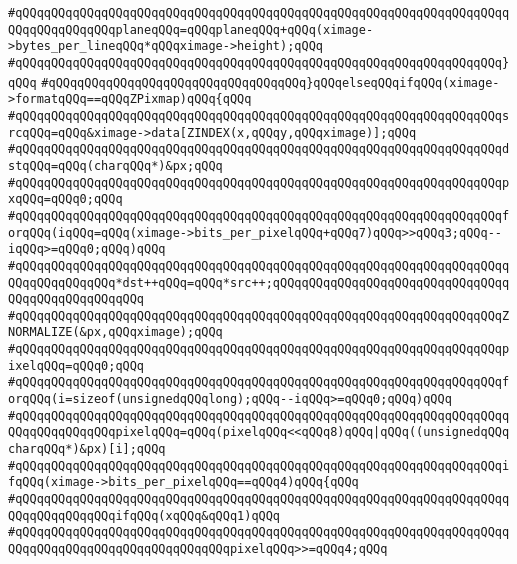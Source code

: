 \verb|#qQQqqQQqqQQqqQQqqQQqqQQqqQQqqQQqqQQqqQQqqQQqqQQqqQQqqQQqqQQqqQQqqQQqqQQqqQQqqQQqqQQqplaneqQQq=qQQqplaneqQQq+qQQq(ximage->bytes_per_lineqQQq*qQQqximage->height);qQQq|\newline
\verb|#qQQqqQQqqQQqqQQqqQQqqQQqqQQqqQQqqQQqqQQqqQQqqQQqqQQqqQQqqQQqqQQqqQQq}qQQq|\newline
\verb|#qQQqqQQqqQQqqQQqqQQqqQQqqQQqqQQqqQQq}qQQqelseqQQqifqQQq(ximage->formatqQQq==qQQqZPixmap)qQQq{qQQq|\newline
\verb|#qQQqqQQqqQQqqQQqqQQqqQQqqQQqqQQqqQQqqQQqqQQqqQQqqQQqqQQqqQQqqQQqqQQqsrcqQQq=qQQq&ximage->data[ZINDEX(x,qQQqy,qQQqximage)];qQQq|\newline
\verb|#qQQqqQQqqQQqqQQqqQQqqQQqqQQqqQQqqQQqqQQqqQQqqQQqqQQqqQQqqQQqqQQqqQQqdstqQQq=qQQq(charqQQq*)&px;qQQq|\newline
\verb|#qQQqqQQqqQQqqQQqqQQqqQQqqQQqqQQqqQQqqQQqqQQqqQQqqQQqqQQqqQQqqQQqqQQqpxqQQq=qQQq0;qQQq|\newline
\verb|#qQQqqQQqqQQqqQQqqQQqqQQqqQQqqQQqqQQqqQQqqQQqqQQqqQQqqQQqqQQqqQQqqQQqforqQQq(iqQQq=qQQq(ximage->bits_per_pixelqQQq+qQQq7)qQQq>>qQQq3;qQQq--iqQQq>=qQQq0;qQQq)qQQq|\newline
\verb|#qQQqqQQqqQQqqQQqqQQqqQQqqQQqqQQqqQQqqQQqqQQqqQQqqQQqqQQqqQQqqQQqqQQqqQQqqQQqqQQqqQQq*dst++qQQq=qQQq*src++;qQQqqQQqqQQqqQQqqQQqqQQqqQQqqQQqqQQqqQQqqQQqqQQqqQQq|\newline
\verb|#qQQqqQQqqQQqqQQqqQQqqQQqqQQqqQQqqQQqqQQqqQQqqQQqqQQqqQQqqQQqqQQqqQQqZNORMALIZE(&px,qQQqximage);qQQq|\newline
\verb|#qQQqqQQqqQQqqQQqqQQqqQQqqQQqqQQqqQQqqQQqqQQqqQQqqQQqqQQqqQQqqQQqqQQqpixelqQQq=qQQq0;qQQq|\newline
\verb|#qQQqqQQqqQQqqQQqqQQqqQQqqQQqqQQqqQQqqQQqqQQqqQQqqQQqqQQqqQQqqQQqqQQqforqQQq(i=sizeof(unsignedqQQqlong);qQQq--iqQQq>=qQQq0;qQQq)qQQq|\newline
\verb|#qQQqqQQqqQQqqQQqqQQqqQQqqQQqqQQqqQQqqQQqqQQqqQQqqQQqqQQqqQQqqQQqqQQqqQQqqQQqqQQqqQQqpixelqQQq=qQQq(pixelqQQq<<qQQq8)qQQq|\verb#|qQQq((unsignedqQQqcharqQQq*)&px)[i];qQQq#\newline
\verb|#qQQqqQQqqQQqqQQqqQQqqQQqqQQqqQQqqQQqqQQqqQQqqQQqqQQqqQQqqQQqqQQqqQQqifqQQq(ximage->bits_per_pixelqQQq==qQQq4)qQQq{qQQq|\newline
\verb|#qQQqqQQqqQQqqQQqqQQqqQQqqQQqqQQqqQQqqQQqqQQqqQQqqQQqqQQqqQQqqQQqqQQqqQQqqQQqqQQqqQQqifqQQq(xqQQq&qQQq1)qQQq|\newline
\verb|#qQQqqQQqqQQqqQQqqQQqqQQqqQQqqQQqqQQqqQQqqQQqqQQqqQQqqQQqqQQqqQQqqQQqqQQqqQQqqQQqqQQqqQQqqQQqqQQqqQQqpixelqQQq>>=qQQq4;qQQq|\newline

